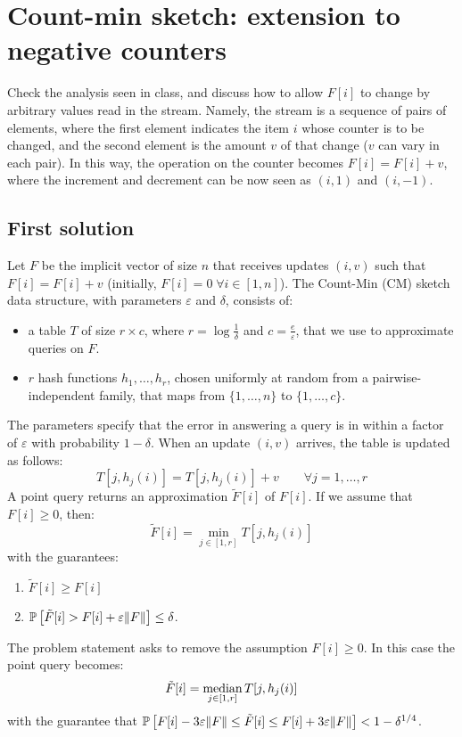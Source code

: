 \section{Count-min sketch: extension to negative counters}

Check the analysis seen in class, and discuss how to allow $F[i]$ to change by arbitrary
values read in the stream.
Namely, the stream is a sequence of pairs of elements, where the first element indicates the
item $i$ whose counter is to be changed, and the second element is the amount $v$ of that
change ($v$ can vary in each pair).
In this way, the operation on the counter becomes $F[i] = F[i] + v$, where the increment
and decrement can be now seen as $(i, 1)$ and $(i, -1)$.


\subsection{First solution}

Let $F$ be the implicit vector of size $n$ that receives updates $(i, v)$ such that $F[i]=F[i]+v$ (initially, $F[i]=0 \; \forall i \in [1, n]$).
The Count-Min (CM) sketch data structure, with parameters $\varepsilon$ and $\delta$, consists of:
\begin{itemize}
  \item a table $T$ of size $r\times c$, where $r=\log\frac{1}{\delta}$ and $c=\frac{e}{\varepsilon}$, that we use to approximate queries on $F$.
  \item $r$ hash functions $h_1, \dots, h_r$, chosen uniformly at random from a pairwise-independent family, that maps from $\{1,\dots,n\}$ to $\{1,\dots,c\}$.
\end{itemize}
The parameters specify that the error in answering a query is in within a factor of $\varepsilon$ with probability $1-\delta$.
When an update $(i, v)$ arrives, the table is updated as follows: 
$$ T[j, h_j(i)] = T[j, h_j(i)] + v \qquad \forall j = 1, \dots, r $$ 
A point query returns an approximation $\tilde{F}[i]$ of $F[i]$. If we assume that $F[i] \geq 0$, then:
$$\tilde{F}[i]=\min_{j\in[1,r]} T[j, h_j(i)]$$ with the guarantees:
\begin{enumerate}
  \item $\tilde{F}[i]\geq F[i]$ 
  \item $\operatorname*{\mathbb{P}}\left[{\tilde{F}[i]>F[i]+\varepsilon\lVert F\rVert}\right]\le\delta$.
\end{enumerate}

The problem statement asks to remove the assumption $F[i]\geq 0$. In this case the point query becomes: 
$$\tilde{F}[i]=\operatorname*{median}_{j\in[1,r]} T[j, h_j(i)]$$
with the guarantee that $\operatorname*{\mathbb{P}}\left[{F[i]-3\varepsilon\lVert F\rVert \leq \tilde{F}[i] \leq F[i]+3\varepsilon\lVert F\rVert}\right] < 1-\delta^{1/4}$.

